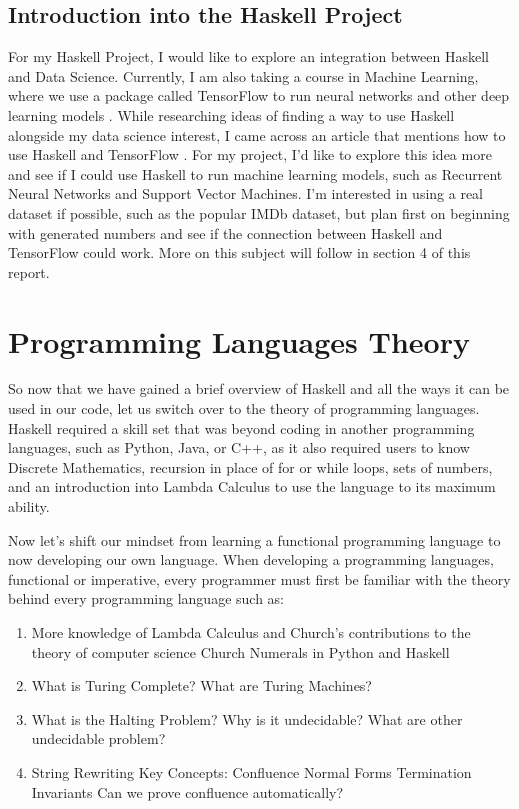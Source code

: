 \documentclass{article}
\begin{document}
\subsection{Introduction into the Haskell Project}

For my Haskell Project, I would like to explore an integration between Haskell and Data Science. Currently, I am also taking a course in Machine Learning, where we use a package called TensorFlow to run neural networks and other deep learning models \cite{TF}. While researching ideas of finding a way to use Haskell alongside my data science interest, I came across an article that mentions how to use Haskell and TensorFlow \cite{HTF}. For my project, I'd like to explore this idea more and see if I could use Haskell to run machine learning models, such as Recurrent Neural Networks and Support Vector Machines. I'm interested in using a real dataset if possible, such as the popular IMDb dataset, but plan first on beginning with generated numbers and see if the connection between Haskell and TensorFlow could work. More on this subject will follow in section 4 of this report.

\section{Programming Languages Theory}

So now that we have gained a brief overview of Haskell and all the ways it can be used in our code, let us switch over to the theory of programming languages. Haskell required a skill set that was beyond coding in another programming languages, such as Python, Java, or C++, as it also required users to know Discrete Mathematics, recursion in place of for or while loops, sets of numbers, and an introduction into Lambda Calculus to use the language to its maximum ability.

\medskip\noindent
Now let's shift our mindset from learning a functional programming language to now developing our own language. When developing a programming languages, functional or imperative, every programmer must first be familiar with the theory behind every programming language such as:

\begin{enumerate}
    \item More knowledge of Lambda Calculus and Church's contributions to the theory of computer science
        Church Numerals in Python and Haskell
    \item What is Turing Complete?
         What are Turing Machines?
    \item What is the Halting Problem? 
         Why is it undecidable? 
         What are other undecidable problem?
    \item String Rewriting
        Key Concepts:
            \subsubitem{ -  }Confluence
            \subsubitem{ -  }Normal Forms
            \subsubitem{ -  }Termination
            \subsubitem{ -  }Invariants
        Can we prove confluence automatically? 
\end{enumerate}
\end{document}

